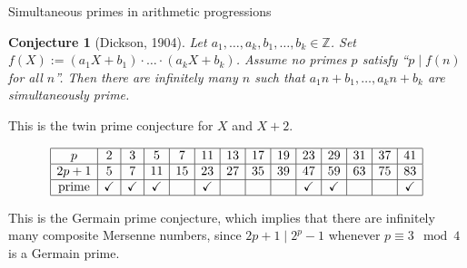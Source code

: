 \documentclass[10pt]{beamer}
\newtheorem{conjecture}{Conjecture}
\begin{document}
\begin{frame}[t]{Simultaneous primes in arithmetic progressions}

\begin{conjecture}[Dickson, 1904]
Let $ a_1, \dots, a_k, b_1, \dots, b_k \in \mathbb{Z} $. Set $ f(X) := (a_1X + b_1) \cdot \dots \cdot (a_kX + b_k) $. Assume no primes $ p $ satisfy ``$ p \mid f(n) $ for all $ n $''. Then there are infinitely many $ n $ such that $ a_1n + b_1, \dots, a_kn + b_k $ are simultaneously prime.
\end{conjecture}

\pause

\vspace{0.5cm} This is the twin prime conjecture for $ X $ and $ X + 2 $.

\pause

\vspace{0.5cm}

\begin{example}[$ X $ and $ 2X + 1 $]
\vspace{-0.5cm}
$$
\begin{array}{|c|c|c|c|c|c|c|c|c|c|c|c|c|c|}
\hline
p & 2 & 3 & 5 & 7 & 11 & 13 & 17 & 19 & 23 & 29 & 31 & 37 & 41 \\
\hline
2p + 1 & 5 & 7 & 11 & 15 & 23 & 27 & 35 & 39 & 47 & 59 & 63 & 75 & 83 \\
\hline
\text{prime} & \checkmark & \checkmark & \checkmark & & \checkmark & & & & \checkmark & \checkmark & & & \checkmark \\
\hline
\end{array}
$$

\pause

This is the Germain prime conjecture, which implies that there are infinitely many composite Mersenne numbers, since $ 2p + 1 \mid 2^p - 1 $ whenever $ p \equiv 3 \mod 4 $ is a Germain prime.
\end{example}

\end{frame}
\end{document}
